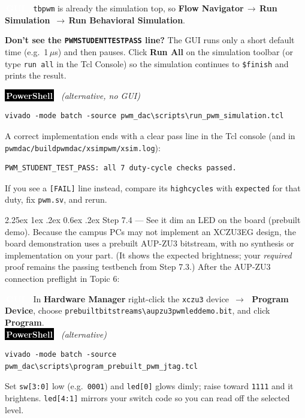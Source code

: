 \documentclass[11pt]{article}
\makeatletter
\newcommand{\guitag}{\colorbox{tudelft}{\textcolor{white}{\footnotesize\bfseries\,GUI\,}}}
\newcommand{\pstag}{\colorbox{black}{\textcolor{white}{\footnotesize\bfseries\,PowerShell\,}}}
\newcommand{\nav}[1]{\textsf{\textbf{#1}}}
\newcommand{\gto}{\,$\rightarrow$\,\allowbreak}
\renewcommand{\_}{\textunderscore\allowbreak}
\let\origtextbackslash\textbackslash
\renewcommand{\textbackslash}{\origtextbackslash\allowbreak}
\renewcommand\paragraph{\@startsection{paragraph}{4}{\z@}%
  {2.25ex \@plus 1ex \@minus .2ex}%
  {0.6ex \@plus .2ex}%
  {\normalfont\normalsize\bfseries}}
\makeatother
\begin{document}
\guitag~ \texttt{tb\_pwm} is already the simulation top, so \nav{Flow Navigator}\gto\nav{Run Simulation}
\gto\nav{Run Behavioral Simulation}.\\
\begin{notebox}
\textbf{Don't see the \texttt{PWM\_STUDENT\_TEST\_PASS} line?} The GUI runs only a short default time
(e.g.\ 1\,$\mu$s) and then pauses. Click \nav{Run All} on the simulation toolbar (or type
\texttt{run all} in the Tcl Console) so the simulation continues to \texttt{\$finish} and prints the result.
\end{notebox}
\pstag~ \emph{(alternative, no GUI)}
\begin{lstlisting}[style=ps]
vivado -mode batch -source pwm_dac\scripts\run_pwm_simulation.tcl
\end{lstlisting}
A correct implementation ends with a clear pass line in the Tcl console (and in
\texttt{pwm\_dac/build\_pwm\_dac/xsim\_pwm/xsim.log}):
\begin{lstlisting}[style=plain]
PWM_STUDENT_TEST_PASS: all 7 duty-cycle checks passed.
\end{lstlisting}
If you see a \texttt{[FAIL]} line instead, compare its \texttt{high\_cycles} with \texttt{expected} for that
duty, fix \texttt{pwm.sv}, and rerun.

\paragraph{Step 7.4 --- See it dim an LED on the board (prebuilt demo).}
Because the campus PCs may not implement an XCZU3EG design, the board demonstration uses a prebuilt AUP-ZU3
bitstream, with no synthesis or implementation on your part. (It shows the expected brightness; your
\emph{required} proof remains the passing testbench from Step 7.3.) After the AUP-ZU3 connection preflight
in Topic 6:

\guitag~ In \nav{Hardware Manager} right-click the \texttt{xczu3} device \gto\ \nav{Program Device}, choose
\texttt{prebuilt\_bitstreams\textbackslash aup\_zu3\_pwm\_led\_demo.bit}, and click \nav{Program}.\\
\pstag~ \emph{(alternative)}
\begin{lstlisting}[style=ps]
vivado -mode batch -source pwm_dac\scripts\program_prebuilt_pwm_jtag.tcl
\end{lstlisting}
Set \texttt{sw[3:0]} low (e.g.\ \texttt{0001}) and \texttt{led[0]} glows dimly; raise toward \texttt{1111}
and it brightens. \texttt{led[4:1]} mirrors your switch code so you can read off the selected level.
\end{document}

